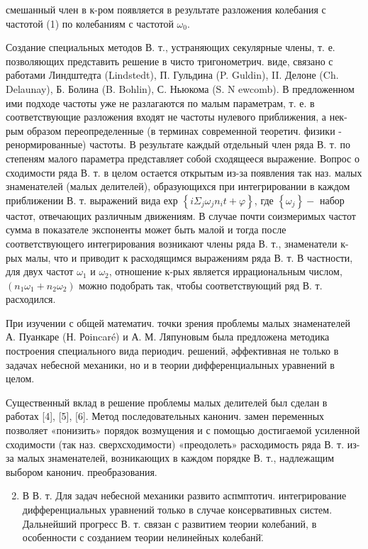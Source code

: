 \documentclass[10pt]{article}
\begin{document}
смешанный член в к-ром появляется в результате разложения колебания с частотой (1) по колебаниям с частотой $\omega_{0}$.



Создание специальных методов В. т., устраняющих секулярные члены, т. е. позволяющих представить решение в чисто тригонометрич. виде, связано с работами Линдштедта (Lindstedt), П. Гульдина (P. Guldin), II. Делоне (Ch. Delaunay), Б. Болина (B. Bohlin), С. Ньюкома (S. N ewcomb). В предложенном ими подходе частоты уже не разлагаются по малым параметрам, т. е. в соответствующие разложения входят не частоты нулевого приближения, а нек-рым образом переопределенные (в терминах современной теоретич. физики - ренормированные) частоты. В результате каждый отдельный член ряда В. т. по степеням малого параметра представляет собой сходящееся выражение. Вопрос о сходимости ряда В. т. в целом остается открытым из-за появления так наз. малых знаменателей (малых делителей), образующихся при интегрировании в каждом приближении В. т. выражений вида ехр $\left\{i \Sigma_{j} \omega_{j} n_{i} t+\varphi\right\}$, где $\left\{\omega_{j}\right\}-$ набор частот, отвечающих различным движениям. В случае почти соизмеримых частот сумма в показателе экспоненты может быть малой и тогда после соответствующего интегрирования возникают члены ряда В. т., знаменатели к-рых малы, что и приводит к расходящимся выражениям ряда В. т. В частности, для двух частот $\omega_{1}$ и $\omega_{2}$, отношение к-рых является иррациональным числом, $\left(n_{1} \omega_{1}+n_{2} \omega_{2}\right)$ можно подобрать так, чтобы соответствующий ряд В. т. расходился.



При изучении с общей математич. точки зрения проблемы малых знаменателей А. Пуанкаре (Н. Роincaré) и А. М. Ляпуновым была предложена методика построения специального вида периодич. решений, әффективная не только в задачах небесной механики, но и в теории дифференциалыных уравнений в целом.



Существенный вклад в решение проблемы малых делителей был сделан в работах [4], [5], [6]. Метод последовательных канонич. замен переменных позволяет «понизить» порядок возмущения и с помощью достигаемой усиленной сходимости (так наз. сверхсходимости) «преодолеть» расходимость ряда В. т. из-за малых знаменателей, возникающих в каждом порядке В. т., надлежащим выбором канонич. преобразования.



\begin{enumerate}

  \setcounter{enumi}{1}

  \item В В. т. Для задач небесной механики развито аспмптотич. интегрирование дифференциальных уравнений только в случае консервативных систем. Дальнейший прогресс В. т. связан с развитием теории колебаний, в особенности с созданием теории нелинейных колебанй̈.

\end{enumerate}
\end{document}
